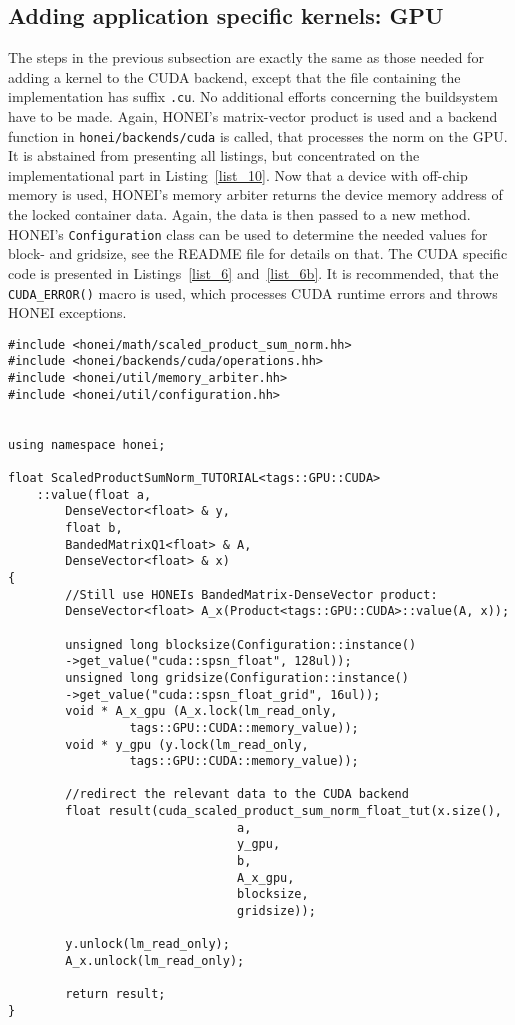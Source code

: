 \documentclass{article}
\begin{document}
\subsection{Adding application specific kernels: GPU}\label{sec:gpu}
The steps in the previous subsection are exactly the same as those needed for adding a kernel to the CUDA backend, except that the file containing the implementation has suffix \texttt{.cu}. No additional efforts concerning the buildsystem have to be made. Again, HONEI's matrix-vector product is used and a backend function in \texttt{honei/backends/cuda} is called, that processes the norm on the GPU. It is abstained from presenting all listings, but concentrated on the implementational part in Listing~\ref{list_10}. Now that a device with off-chip memory is used, HONEI's memory arbiter returns the device memory address of the locked container data. Again, the data is then passed to a new method. HONEI's \texttt{Configuration} class can be used to determine the needed values for block- and gridsize, see the README file for details on that. The CUDA specific code is presented in Listings~\ref{list_6} and~\ref{list_6b}. It is recommended, that the \texttt{CUDA\_ERROR()} macro is used, which processes CUDA runtime errors and throws HONEI exceptions.

\begin{lstlisting}[float, caption= Developing kernels - CUDA header, label=list_10]
#include <honei/math/scaled_product_sum_norm.hh>
#include <honei/backends/cuda/operations.hh>
#include <honei/util/memory_arbiter.hh>
#include <honei/util/configuration.hh>


using namespace honei;

float ScaledProductSumNorm_TUTORIAL<tags::GPU::CUDA>
	::value(float a,
		DenseVector<float> & y,
		float b,
		BandedMatrixQ1<float> & A,
		DenseVector<float> & x)
{
        //Still use HONEIs BandedMatrix-DenseVector product:
        DenseVector<float> A_x(Product<tags::GPU::CUDA>::value(A, x));

        unsigned long blocksize(Configuration::instance()
		->get_value("cuda::spsn_float", 128ul));
        unsigned long gridsize(Configuration::instance()
		->get_value("cuda::spsn_float_grid", 16ul));
        void * A_x_gpu (A_x.lock(lm_read_only,
				 tags::GPU::CUDA::memory_value));
        void * y_gpu (y.lock(lm_read_only,
				 tags::GPU::CUDA::memory_value));

        //redirect the relevant data to the CUDA backend
        float result(cuda_scaled_product_sum_norm_float_tut(x.size(),
							    a,
							    y_gpu,
							    b,
							    A_x_gpu,
							    blocksize,
							    gridsize));

        y.unlock(lm_read_only);
        A_x.unlock(lm_read_only);

        return result;
}
\end{lstlisting}
\end{document}
